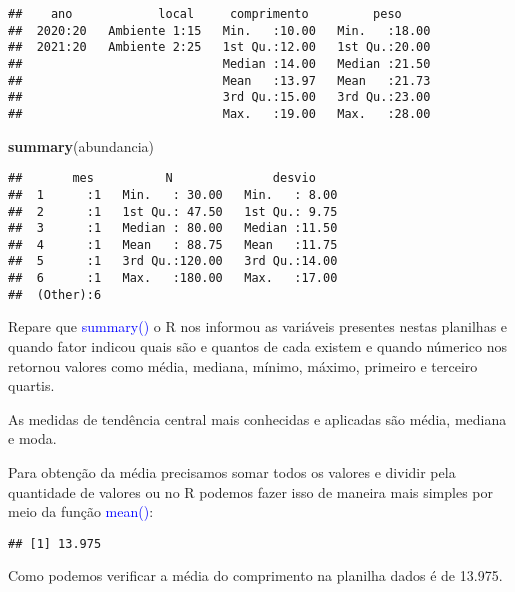 \documentclass[titlepage, oneside, openany, a4paper]{book}
\newenvironment{Shaded}{\begin{snugshade}}{\end{snugshade}}
\newcommand{\KeywordTok}[1]{\textcolor[rgb]{0.13,0.29,0.53}{\textbf{#1}}}
\newcommand{\NormalTok}[1]{#1}
\newcommand{\OperatorTok}[1]{\textcolor[rgb]{0.81,0.36,0.00}{\textbf{#1}}}
\begin{document}
\begin{verbatim}
##    ano            local     comprimento         peso      
##  2020:20   Ambiente 1:15   Min.   :10.00   Min.   :18.00  
##  2021:20   Ambiente 2:25   1st Qu.:12.00   1st Qu.:20.00  
##                            Median :14.00   Median :21.50  
##                            Mean   :13.97   Mean   :21.73  
##                            3rd Qu.:15.00   3rd Qu.:23.00  
##                            Max.   :19.00   Max.   :28.00
\end{verbatim}

\begin{Shaded}
\begin{Highlighting}[]
\KeywordTok{summary}\NormalTok{(abundancia)}
\end{Highlighting}
\end{Shaded}

\begin{verbatim}
##       mes          N              desvio     
##  1      :1   Min.   : 30.00   Min.   : 8.00  
##  2      :1   1st Qu.: 47.50   1st Qu.: 9.75  
##  3      :1   Median : 80.00   Median :11.50  
##  4      :1   Mean   : 88.75   Mean   :11.75  
##  5      :1   3rd Qu.:120.00   3rd Qu.:14.00  
##  6      :1   Max.   :180.00   Max.   :17.00  
##  (Other):6
\end{verbatim}

Repare que \textcolor{blue}{summary()} o R nos informou as variáveis presentes nestas planilhas e quando fator indicou quais são e quantos de cada existem e quando númerico nos retornou valores como média, mediana, mínimo, máximo, primeiro e terceiro quartis.

As medidas de tendência central mais conhecidas e aplicadas são média, mediana e moda.

Para obtenção da média precisamos somar todos os valores e dividir pela quantidade de valores ou no R podemos fazer isso de maneira mais simples por meio da função \textcolor{blue}{mean()}:

\begin{Shaded}
\end{Shaded}

\begin{verbatim}
## [1] 13.975
\end{verbatim}

Como podemos verificar a média do comprimento na planilha dados é de 13.975.
\end{document}
